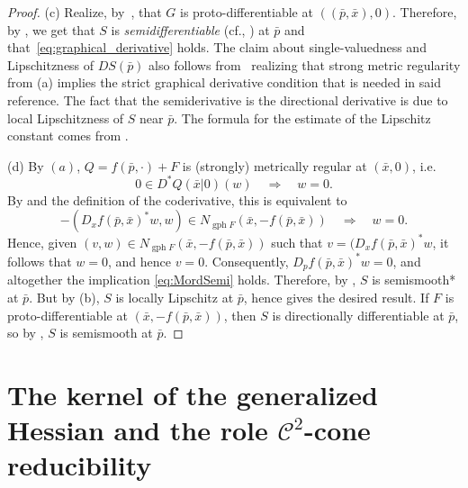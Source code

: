 \documentclass[reqno]{amsart}
\numberwithin{equation}{section}
\newcommand{\x}{\bar{x}}
\newcommand{\gph}{\operatorname{gph}}
\begin{document}
\begin{proof}
\noindent
(c) Realize, by~\cite[Lemma 4]{FGH 22}, that $G$ is proto-differentiable at
$((\bar p, \bar x),0)$. Therefore, by \cite[Theorem 9.56 (c)]{RoW 98}, we get that $S$ is \emph{semidifferentiable}
(cf., \cite[Chapter 8H]{RoW 98}) at $\bar p$ and
that~\cref{eq:graphical_derivative} holds. The claim about single-valuedness and Lipschitzness of $DS(\bar p)$ also follows from~\cite[Theorem 9.56 (c)]{RoW 98} realizing that strong metric regularity from (a) implies the strict graphical derivative condition that is needed in said reference. The fact that the semiderivative is the directional derivative is due to local Lipschitzness of $S$ near $\bar p$. The formula for the estimate of the Lipschitz constant comes from \cite[Theorem 4B.2]{DoR 14}.

\smallskip

\noindent
(d) By $(a)$, $Q=f(\bar p,\cdot)+F$ is (strongly) metrically regular at $(\bar x,0)$, i.e. 
\[
0\in D^*Q(\bar x|0)(w)\quad\Longrightarrow\quad w=0.
\]
By   and the definition of the coderivative, this is equivalent to
\[
-(D_x f(\bar p,\bar x)^*w,w)\in N_{\gph F}(\bar x,-f(\bar p,\bar x))\quad\Longrightarrow\quad w=0.
\]
Hence, given $(v,w)\in N_{\gph F}(\bar x,-f(\bar p,\bar x))$ such that $v=(D_x f(\bar p,\bar x)^*w$, it follows that 
$w=0$, and hence $v=0$. Consequently, $D_pf(\bar p,\bar x)^*w=0$, and altogether the implication \eqref{eq:MordSemi} holds. Therefore, by , $S$ is semismooth* at $\bar p$.
 But by (b), $S$ is locally Lipschitz  at $\bar p$, hence  gives the desired result. If $F$ is proto-differentiable at $(\bar x, -f(\bar p, \x))$, then $S$ is directionally differentiable at $\bar p$, so by , $S$ is semismooth at $\bar p$.

\end{proof}


\section{The kernel of the generalized Hessian and the role $\mathcal{C}^2$-cone reducibility}\label{sec:Kernel}
\end{document}
